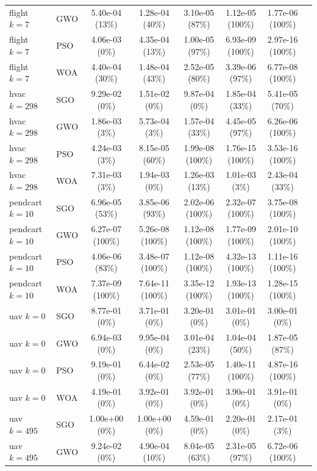 \begin{table}[htbp]
{\begin{tabular}{@{}llcccccc@{}}
flight $k{=}7$ & GWO & 5.40e-04 (13\%) & 1.28e-04 (40\%) & 3.10e-05 (87\%) & 1.12e-05 (100\%) & 1.77e-06 (100\%) \\
flight $k{=}7$ & PSO & 4.06e-03 (0\%) & 4.35e-04 (13\%) & 1.00e-05 (97\%) & 6.93e-09 (100\%) & 2.97e-16 (100\%) \\
flight $k{=}7$ & WOA & 4.40e-04 (30\%) & 1.48e-04 (43\%) & 2.52e-05 (80\%) & 3.39e-06 (97\%) & 6.77e-08 (100\%) \\
\midrule
hvac $k{=}298$ & SGO & 9.29e-02 (0\%) & 1.51e-02 (0\%) & 9.87e-04 (0\%) & 1.85e-04 (33\%) & 5.41e-05 (70\%) \\
hvac $k{=}298$ & GWO & 1.86e-03 (3\%) & 5.73e-04 (3\%) & 1.57e-04 (33\%) & 4.45e-05 (97\%) & 6.26e-06 (100\%) \\
hvac $k{=}298$ & PSO & 4.24e-03 (3\%) & 8.15e-05 (60\%) & 1.99e-08 (100\%) & 1.76e-15 (100\%) & 3.53e-16 (100\%) \\
hvac $k{=}298$ & WOA & 7.31e-03 (3\%) & 1.94e-03 (0\%) & 1.26e-03 (13\%) & 1.01e-03 (3\%) & 2.43e-04 (33\%) \\
\midrule
pendcart $k{=}10$ & SGO & 6.96e-05 (53\%) & 3.85e-06 (93\%) & 2.02e-06 (100\%) & 2.32e-07 (100\%) & 3.75e-08 (100\%) \\
pendcart $k{=}10$ & GWO & 6.27e-07 (100\%) & 5.26e-08 (100\%) & 1.12e-08 (100\%) & 1.77e-09 (100\%) & 2.01e-10 (100\%) \\
pendcart $k{=}10$ & PSO & 4.06e-06 (83\%) & 3.48e-07 (100\%) & 1.12e-08 (100\%) & 4.32e-13 (100\%) & 1.11e-16 (100\%) \\
pendcart $k{=}10$ & WOA & 7.37e-09 (100\%) & 7.64e-11 (100\%) & 3.35e-12 (100\%) & 1.93e-13 (100\%) & 1.28e-15 (100\%) \\
\midrule
uav $k{=}0$ & SGO & 8.77e-01 (0\%) & 3.71e-01 (0\%) & 3.20e-01 (0\%) & 3.01e-01 (0\%) & 3.00e-01 (0\%) \\
uav $k{=}0$ & GWO & 6.94e-03 (0\%) & 9.95e-04 (0\%) & 3.01e-04 (23\%) & 1.04e-04 (50\%) & 1.87e-05 (87\%) \\
uav $k{=}0$ & PSO & 9.19e-01 (0\%) & 6.44e-02 (0\%) & 2.53e-05 (77\%) & 1.40e-11 (100\%) & 4.87e-16 (100\%) \\
uav $k{=}0$ & WOA & 4.19e-01 (0\%) & 3.92e-01 (0\%) & 3.92e-01 (0\%) & 3.90e-01 (0\%) & 3.91e-01 (0\%) \\
\midrule
uav $k{=}495$ & SGO & 1.00e+00 (0\%) & 1.00e+00 (0\%) & 4.59e-01 (0\%) & 2.20e-01 (0\%) & 2.17e-01 (3\%) \\
uav $k{=}495$ & GWO & 9.24e-02 (0\%) & 4.90e-04 (10\%) & 8.04e-05 (63\%) & 2.31e-05 (97\%) & 6.72e-06 (100\%) \\

\end{tabular}}
\end{table}
